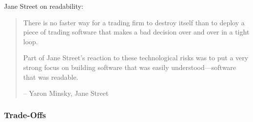 \begin{frame}

    Jane Street on readability:

    \vspace{0.5em}
    \vspace{0.5em}
    
    \begin{quote}
        There is no faster way for a
        trading firm to destroy itself than to deploy a piece of trading
    software that makes a bad decision over and over in a tight loop.
        \vspace{2em}

        Part of Jane Street's reaction to these technological risks was to
        put a very strong focus on building software that was easily
    understood---software that was readable.
        \vspace{2em}

        -- {\sf Yaron Minsky, Jane Street}
    \end{quote}


\end{frame}





\begin{frame}
    \frametitle{Trade-Offs}

    \begin{figure}
       \begin{center}
       \end{center}
    \end{figure}

\end{frame}



